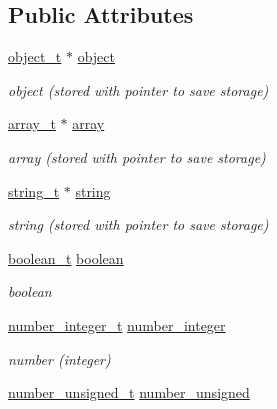 \subsection*{Public Attributes}
\begin{DoxyCompactItemize}
\item 
\hyperlink{classnlohmann_1_1basic__json_a5e48a7893520e1314bf0c9723e26ea2a}{object\+\_\+t} $\ast$ \hyperlink{unionnlohmann_1_1basic__json_1_1json__value_a4a2209bb26e7088cd36bf24824ab5521}{object}
\begin{DoxyCompactList}\small\item\em object (stored with pointer to save storage) \end{DoxyCompactList}\item 
\hyperlink{classnlohmann_1_1basic__json_ae095578e03df97c5b3991787f1056374}{array\+\_\+t} $\ast$ \hyperlink{unionnlohmann_1_1basic__json_1_1json__value_a7947687f3ae1911d6e9847e2b3226157}{array}
\begin{DoxyCompactList}\small\item\em array (stored with pointer to save storage) \end{DoxyCompactList}\item 
\hyperlink{classnlohmann_1_1basic__json_a61f8566a1a85a424c7266fb531dca005}{string\+\_\+t} $\ast$ \hyperlink{unionnlohmann_1_1basic__json_1_1json__value_a9856fb4271b50d738e14c5a9a2f05118}{string}
\begin{DoxyCompactList}\small\item\em string (stored with pointer to save storage) \end{DoxyCompactList}\item 
\hyperlink{classnlohmann_1_1basic__json_a4c919102a9b4fe0d588af64801436082}{boolean\+\_\+t} \hyperlink{unionnlohmann_1_1basic__json_1_1json__value_afd0f8ec00c40301efffd01a276959371}{boolean}
\begin{DoxyCompactList}\small\item\em boolean \end{DoxyCompactList}\item 
\hyperlink{classnlohmann_1_1basic__json_a98e611d67b7bd75307de99c9358ab2dc}{number\+\_\+integer\+\_\+t} \hyperlink{unionnlohmann_1_1basic__json_1_1json__value_afa3c414445aeffb56a7c6926f9420941}{number\+\_\+integer}
\begin{DoxyCompactList}\small\item\em number (integer) \end{DoxyCompactList}\item 
\hyperlink{classnlohmann_1_1basic__json_ab906e29b5d83ac162e823ada2156b989}{number\+\_\+unsigned\+\_\+t} \hyperlink{unionnlohmann_1_1basic__json_1_1json__value_a0299a6aa3bc4d45d54130e52970f73d3}{number\+\_\+unsigned}

\end{DoxyCompactItemize}
